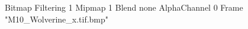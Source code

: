 {Bitmap
	{Filtering 1}
	{Mipmap 1}
	{Blend none}
	{AlphaChannel 0}
	{Frame "M10_Wolverine_x.tif.bmp"}
}
